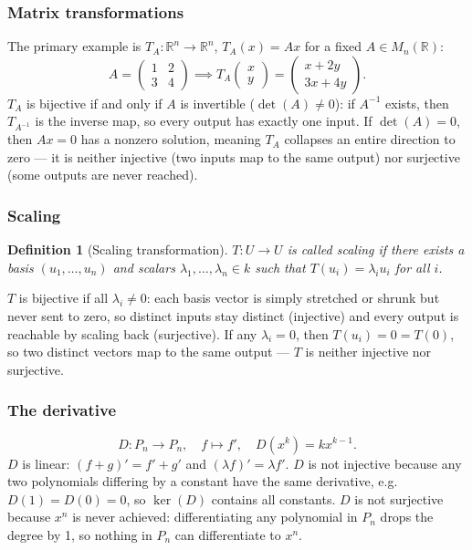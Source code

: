 \documentclass{article}
\newtheorem{definition}{Definition}
\begin{document}
\subsubsection*{Matrix transformations} The primary example is $T_A: \mathbb{R}^n\to\mathbb{R}^n$, $T_A(x) = Ax$ for a fixed $A\in M_n(\mathbb{R})$:
\[A = \begin{pmatrix}1&2\\3&4\end{pmatrix} \implies T_A\begin{pmatrix}x\\y\end{pmatrix} = \begin{pmatrix}x+2y\\3x+4y\end{pmatrix}.\]
$T_A$ is bijective if and only if $A$ is invertible ($\det(A)\neq 0$): if $A^{-1}$ exists, then $T_{A^{-1}}$ is the inverse map, so every output has exactly one input. If $\det(A)=0$, then $Ax=0$ has a nonzero solution, meaning $T_A$ collapses an entire direction to zero --- it is neither injective (two inputs map to the same output) nor surjective (some outputs are never reached).

\subsubsection*{Scaling}
\begin{definition}[Scaling transformation]
    $T: U\to U$ is called scaling if there exists a basis $(u_1,\ldots,u_n)$ and scalars $\lambda_1,\ldots,\lambda_n\in k$ such that $T(u_i)=\lambda_iu_i$ for all $i$.
\end{definition}
$T$ is bijective if all $\lambda_i \neq 0$: each basis vector is simply stretched or shrunk but never sent to zero, so distinct inputs stay distinct (injective) and every output is reachable by scaling back (surjective). If any $\lambda_i = 0$, then $T(u_i) = 0 = T(0)$, so two distinct vectors map to the same output --- $T$ is neither injective nor surjective.

\subsubsection*{The derivative}
\[D: P_n\to P_n, \quad f\mapsto f', \quad D(x^k)=kx^{k-1}.\]
$D$ is linear: $(f+g)'=f'+g'$ and $(\lambda f)'=\lambda f'$. $D$ is not injective because any two polynomials differing by a constant have the same derivative, e.g.\ $D(1)=D(0)=0$, so $\ker(D)$ contains all constants. $D$ is not surjective because $x^n$ is never achieved: differentiating any polynomial in $P_n$ drops the degree by 1, so nothing in $P_n$ can differentiate to $x^n$.
\end{document}
